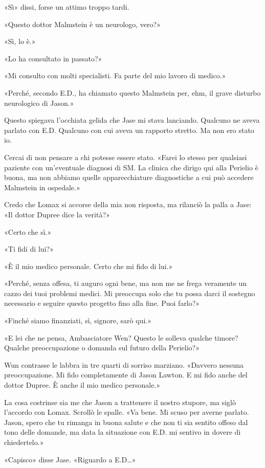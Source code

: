 «Sì» dissi, forse un attimo troppo tardi.

«Questo dottor Malmstein è un neurologo, vero?»

«Sì, lo è.»

«Lo ha consultato in passato?»

«Mi consulto con molti specialisti. Fa parte del mio lavoro di medico.»

«Perché, secondo E.D., ha chiamato questo Malmstein per, ehm, il grave
disturbo neurologico di Jason.»

Questo spiegava l'occhiata gelida che Jase mi stava lanciando. Qualcuno
ne aveva parlato con E.D. Qualcuno con cui aveva un rapporto stretto. Ma
non ero stato io.

Cercai di non pensare a chi potesse essere stato. «Farei lo stesso per
qualsiasi paziente con un'eventuale diagnosi di SM. La clinica che
dirigo qui alla Perielio è buona, ma non abbiamo quelle apparecchiature
diagnostiche a cui può accedere Malmstein in ospedale.»

Credo che Lomax si accorse della mia non risposta, ma rilanciò la palla
a Jase: «Il dottor Dupree dice la verità?»

«Certo che sì.»

«Ti fidi di lui?»

«È il mio medico personale. Certo che mi fido di lui.»

«Perché, senza offesa, ti auguro ogni bene, ma non me ne frega veramente
un cazzo dei tuoi problemi medici. Mi preoccupa solo che tu possa darci
il sostegno necessario e seguire questo progetto fino alla fine. Puoi
farlo?»

«Finché siamo finanziati, sì, signore, sarò qui.»

«E lei che ne pensa, Ambasciatore Wen? Questo le solleva qualche timore?
Qualche preoccupazione o domanda sul futuro della Perielio?»

Wun contrasse le labbra in tre quarti di sorriso marziano. «Davvero
nessuna preoccupazione. Mi fido completamente di Jason Lawton. E mi fido
anche del dottor Dupree. È anche il mio medico personale.»

La cosa costrinse sia me che Jason a trattenere il nostro stupore, ma
siglò l'accordo con Lomax. Scrollò le spalle. «Va bene. Mi scuso per
averne parlato. Jason, spero che tu rimanga in buona salute e che non ti
sia sentito offeso dal tono delle domande, ma data la situazione con
E.D. mi sentivo in dovere di chiedertelo.»

«Capisco» disse Jase. «Riguardo a E.D\ldots»

